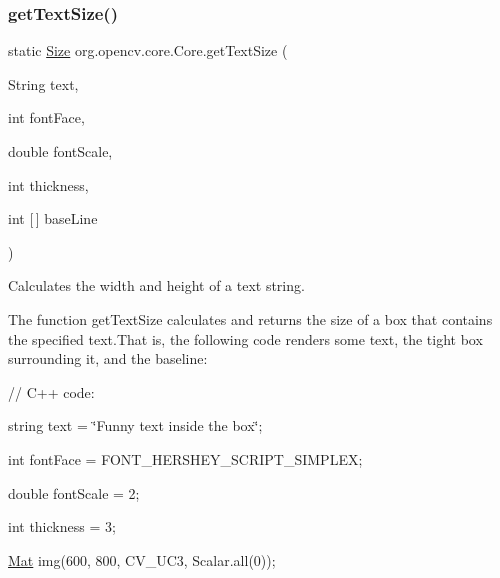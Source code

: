 \subsubsection{\texorpdfstring{get\+Text\+Size()}{getTextSize()}}
{\footnotesize\ttfamily static \mbox{\hyperlink{classorg_1_1opencv_1_1core_1_1_size}{Size}} org.\+opencv.\+core.\+Core.\+get\+Text\+Size (\begin{DoxyParamCaption}\item[{String}]{text,  }\item[{int}]{font\+Face,  }\item[{double}]{font\+Scale,  }\item[{int}]{thickness,  }\item[{int \mbox{[}$\,$\mbox{]}}]{base\+Line }\end{DoxyParamCaption})\hspace{0.3cm}{\ttfamily [static]}}

Calculates the width and height of a text string.

The function {\ttfamily get\+Text\+Size} calculates and returns the size of a box that contains the specified text.\+That is, the following code renders some text, the tight box surrounding it, and the baseline\+: {\ttfamily }

{\ttfamily }

{\ttfamily }

{\ttfamily // C++ code\+:}

{\ttfamily }

{\ttfamily }

{\ttfamily string text = \char`\"{}\+Funny text inside the box\char`\"{};}

{\ttfamily }

{\ttfamily }

{\ttfamily int font\+Face = F\+O\+N\+T\+\_\+\+H\+E\+R\+S\+H\+E\+Y\+\_\+\+S\+C\+R\+I\+P\+T\+\_\+\+S\+I\+M\+P\+L\+EX;}

{\ttfamily }

{\ttfamily }

{\ttfamily double font\+Scale = 2;}

{\ttfamily }

{\ttfamily }

{\ttfamily int thickness = 3;}

{\ttfamily }

{\ttfamily }

{\ttfamily \mbox{\hyperlink{classorg_1_1opencv_1_1core_1_1_mat}{Mat}} img(600, 800, C\+V\+\_\+U\+C3, Scalar.\+all(0));}

